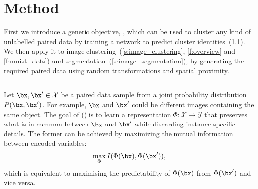\section{Method}\label{s:method}

First we introduce a generic objective, \methodname, which can be used to cluster any kind of unlabelled paired data by training a network to predict cluster identities~(\cref{s:generic_clustering}).
We then apply it to image clustering~(\cref{s:image_clustering}, \cref{f:overview} and \cref{f:mnist_dots}) and segmentation~(\cref{s:image_segmentation}), by generating the required paired data using random transformations and spatial proximity. 


\subsection{\methodname}\label{s:generic_clustering}

Let $\bx,\bx' \in \mathcal{X}$ be a paired data sample from a joint probability distribution $P(\bx,\bx')$.
For example, $\bx$ and $\bx'$ could be different images containing the same object.
The goal of \methodname (\methodnameshort) is to learn a representation $\Phi:\mathcal{X}\rightarrow\mathcal{Y}$ that preserves what is in common between $\bx$ and $\bx'$ while discarding instance-specific details.
The former can be achieved by maximizing the mutual information between encoded variables:
\begin{equation}\label{e:info_orig}
\max_\Phi I(\Phi(\bx),\Phi(\bx')),
\end{equation}
which is equivalent to maximising the predictability of $\Phi(\bx)$ from $\Phi(\bx')$ and vice versa. 

